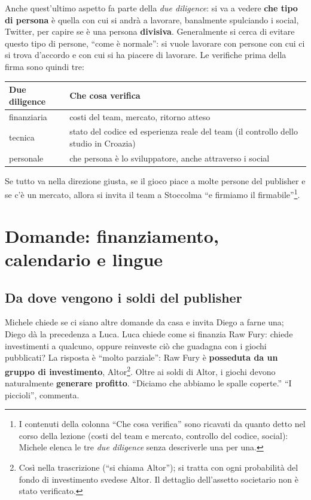 Anche quest'ultimo aspetto fa parte della \emph{due diligence}: si va a vedere
\textbf{che tipo di persona} è quella con cui si andrà a lavorare, banalmente
spulciando i social, Twitter, per capire se è una persona \textbf{divisiva}.
Generalmente si cerca di evitare questo tipo di persone, ``come è normale'':
si vuole lavorare con persone con cui ci si trova d'accordo e con cui si ha
piacere di lavorare. Le verifiche prima della firma sono quindi tre:
\begin{center}
  \begin{tabular}{@{}lp{}@{}}
    \toprule
    \textbf{Due diligence} & \textbf{Che cosa verifica} \\
    \midrule
    finanziaria & costi del team, mercato, ritorno atteso \\
    tecnica & stato del codice ed esperienza reale del team (il controllo
    dello studio in Croazia) \\
    personale & che persona è lo sviluppatore, anche attraverso i social \\
    \bottomrule
  \end{tabular}
\end{center}
Se tutto va nella direzione giusta, se il gioco piace a molte persone del
publisher e se c'è un mercato, allora si invita il team a Stoccolma ``e
firmiamo il firmabile''\footnote{I contenuti della colonna ``Che cosa
verifica'' sono ricavati da quanto detto nel corso della lezione (costi del
team e mercato, controllo del codice, social): Michele elenca le tre
\emph{due diligence} senza descriverle una per una.}.

\section{Domande: finanziamento, calendario e lingue}
\label{sec:z4-qa-finale}

\subsection{Da dove vengono i soldi del publisher}

Michele chiede se ci siano altre domande da casa e invita Diego a farne una; Diego
dà la precedenza a Luca. Luca chiede come si finanzia Raw Fury: chiede
investimenti a qualcuno, oppure reinveste ciò che guadagna con i giochi
pubblicati? La risposta è ``molto parziale'': Raw Fury è \textbf{posseduta da un
gruppo di investimento}, Altor\footnote{Così nella trascrizione (``si chiama
Altor''); si tratta con ogni probabilità del fondo di investimento svedese
Altor. Il dettaglio dell'assetto societario non è stato verificato.}. Oltre ai
soldi di Altor, i giochi devono naturalmente \textbf{generare profitto}. ``Diciamo
che abbiamo le spalle coperte.'' ``I piccioli'', commenta.

